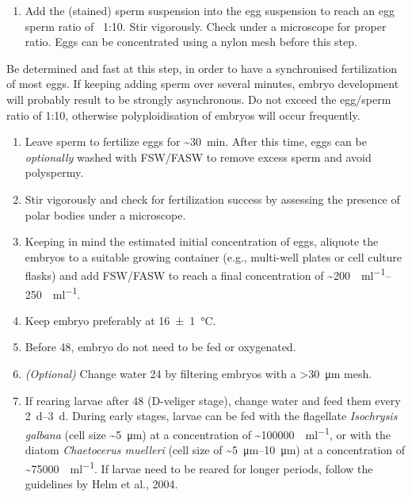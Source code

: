 \documentclass[10pt]{report}
\begin{document}
\begin{enumerate}[resume = steps]
	\item Add the (stained) sperm suspension into the egg suspension to reach an egg sperm ratio of ~1:10. Stir vigorously. Check under a microscope for proper ratio. Eggs can be concentrated using a nylon mesh before this step.
\end{enumerate}

\bigskip\alert{Be determined and fast at this step, in order to have a synchronised fertilization of most eggs. If keeping adding sperm over several minutes, embryo development will probably result to be strongly asynchronous.}
\alert{Do not exceed the egg/sperm ratio of 1:10, otherwise polyploidisation of embryos will occur frequently.}

\begin{enumerate}[resume = steps]
	\item Leave sperm to fertilize eggs for \qty{~30}{\minute}. After this time, eggs can be \textit{optionally} washed with FSW/FASW to remove excess sperm and avoid polyspermy. 
	\item Stir vigorously and check for fertilization success by assessing the presence of polar bodies under a microscope.
	\item Keeping in mind the estimated initial concentration of eggs, aliquote the embryos to a suitable growing container (e.g., multi-well plates or cell culture flasks) and add FSW/FASW to reach a final concentration of \qtyrange{~200}{250}{\embryo\per\ml}.
	\item Keep embryo preferably at \qty{16\pm1}{\degreeCelsius}.
	\item Before \qty{48}{\hpf}, embryo do not need to be fed or oxygenated.
	\item \textit{(Optional)} Change water \qty{24}{\hpf} by filtering embryos with a \qty{>30}{\um} mesh.
	\item If rearing larvae after \qty{48}{\hpf} (D-veliger stage), change water and feed them every \qtyrange{2}{3}{\day}. During early stages, larvae can be fed with the flagellate \textit{Isochrysis galbana} (cell size \qty{~5}{\um}) at a concentration of \qty[scientific-notation = false, group-digits = false]{~100000}{\cells\per\ml}, or with the diatom \textit{Chaetocerus muelleri} (cell size of \qtyrange{~5}{10}{\um}) at a concentration of \qty[scientific-notation = false, group-digits = false]{~75000}{\cells\per\ml}. If larvae need to be reared for longer periods, follow the guidelines by Helm et al., 2004.
\end{enumerate}
\end{document}
